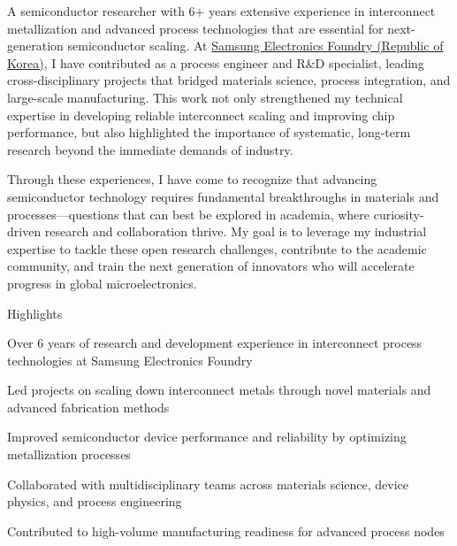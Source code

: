 


\begin{cvparagraph}


A semiconductor researcher with 6+ years extensive experience in interconnect metallization and advanced 
process technologies that are essential for next-generation semiconductor scaling.  
At \href{https://www.samsungfoundry.com}{Samsung Electronics Foundry (Republic of Korea)}, 
I have contributed as a process engineer and R\&D specialist,
leading cross-disciplinary projects that bridged materials science, process integration, 
and large-scale manufacturing. This work not only strengthened my technical expertise in developing 
reliable interconnect scaling and improving chip performance, but also highlighted the importance 
of systematic, long-term research beyond the immediate demands of industry.  

Through these experiences, I have come to recognize that advancing semiconductor technology 
requires fundamental breakthroughs in materials and processes—questions that can best be 
explored in academia, where curiosity-driven research and collaboration thrive.  
My goal is to leverage my industrial expertise to tackle these open research challenges, 
contribute to the academic community, and train the next generation of innovators 
who will accelerate progress in global microelectronics.  
 
\end{cvparagraph}

\newcommand{\lineintv}{\vspace{0.0cm}} %

\cventry
  {} %
  {Highlights\vspace{-0.3cm}} %
  {} %
  {} %
  {
    \begin{cvitems} %
      \item {Over 6 years of research and development experience in interconnect process technologies at Samsung Electronics Foundry}
      \item {Led projects on scaling down interconnect metals through novel materials and advanced fabrication methods}
      \item {Improved semiconductor device performance and reliability by optimizing metallization processes}
      \item {Collaborated with multidisciplinary teams across materials science, device physics, and process engineering}
      \item {Contributed to high-volume manufacturing readiness for advanced process nodes}
    \end{cvitems}
  }

